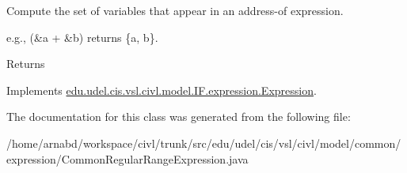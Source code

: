 Compute the set of variables that appear in an address-\/of expression. 

e.\+g., {\ttfamily (\&a + \&b)} returns {\ttfamily \{a, b\}}.

\begin{DoxyReturn}{Returns}

\end{DoxyReturn}


Implements \hyperlink{interfaceedu_1_1udel_1_1cis_1_1vsl_1_1civl_1_1model_1_1IF_1_1expression_1_1Expression_ac2ad0236534bec54b91ee78ff658cbe0}{edu.\+udel.\+cis.\+vsl.\+civl.\+model.\+I\+F.\+expression.\+Expression}.



The documentation for this class was generated from the following file\+:\begin{DoxyCompactItemize}
\item 
/home/arnabd/workspace/civl/trunk/src/edu/udel/cis/vsl/civl/model/common/expression/Common\+Regular\+Range\+Expression.\+java\end{DoxyCompactItemize}
